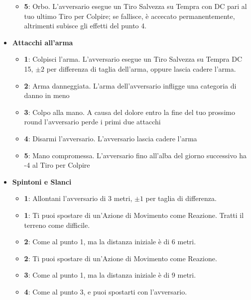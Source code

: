 \begin{multicols}{2}
\begin{itemize}[leftmargin=*]
\begin{itemize}[leftmargin=*]
\item \textbf{5}: Orbo. L'avversario esegue un Tiro Salvezza su Tempra con DC pari al tuo ultimo Tiro per Colpire; se fallisce, è accecato permanentemente, altrimenti subisce gli effetti del punto 4.
	\end{itemize}

	\item \textbf{Attacchi all'arma}
	\begin{itemize}[leftmargin=*]
		\setlength{\itemsep}{0pt}
\item \textbf{1}: Colpisci l'arma. L'avversario esegue un Tiro Salvezza su Tempra DC 15, $ \pm 2 $ per differenza di taglia dell'arma, oppure lascia cadere l'arma.

		\item \textbf{2}: Arma danneggiata. L'arma dell'avversario infligge una categoria di danno in meno

		\item \textbf{3}: Colpo alla mano. A causa del dolore entro la fine del tuo prossimo round l'avversario perde i primi due attacchi

		\item \textbf{4}: Disarmi l'avversario. L'avversario lascia cadere l'arma

		\item \textbf{5}: Mano compromessa. L'avversario fino all'alba del giorno successivo ha -4 al Tiro per Colpire
	\end{itemize}

	\item \textbf{Spintoni e Slanci}
	\begin{itemize}[leftmargin=*]
		\setlength{\itemsep}{0pt}
\item \textbf{1}: Allontani l'avversario di 3 metri, $ \pm 1$ per taglia di differenza.

\item \textbf{1}: Ti puoi spostare di un'Azione di Movimento come Reazione. Tratti il terreno come difficile.

\item \textbf{2}: Come al punto 1, ma la distanza iniziale è di 6 metri.

\item \textbf{2}: Ti puoi spostare di un'Azione di Movimento come Reazione.

\item \textbf{3}: Come al punto 1, ma la distanza iniziale è di 9 metri.

\item \textbf{4}: Come al punto 3, e puoi spostarti con l'avversario.
	\end{itemize}


\end{itemize}
\end{multicols}
